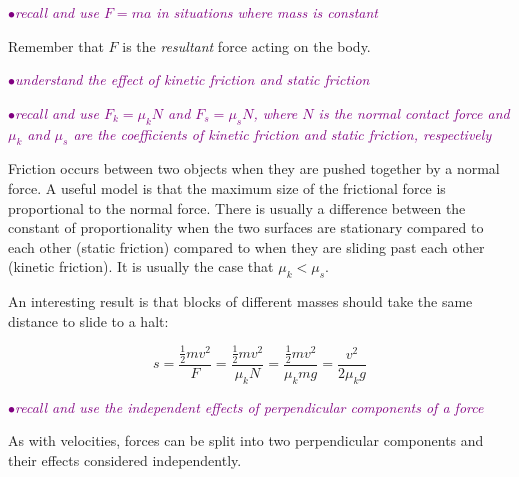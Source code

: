 \documentclass[a4paper,11pt,twoside]{memoir}
\newcounter{spec}[chapter]
\newcommand{\spec}[1]{\Needspace{5\baselineskip}\textcolor{purple}{$\bullet$\hspace{0.5cm}\textit{#1}}}
\begin{document}
\spec{recall and use $F = ma$ in situations where mass is constant}

Remember that $F$ is the \emph{resultant} force acting on the body.

\spec{understand the effect of kinetic friction and static friction}

\spec{recall and use $F_k = \mu_k N$ and $F_s = \mu_s N$, where $N$ is the normal contact force and $\mu_k$ and $\mu_s$ are the coefficients of kinetic friction and static friction, respectively}

Friction occurs between two objects when they are pushed together by a normal force. A useful model is that the maximum size of the frictional force is proportional to the normal force. There is usually a difference between the constant of proportionality when the two surfaces are stationary compared to each other (static friction) compared to when they are sliding past each other (kinetic friction). It is usually the case that $\mu_k < \mu_s$.

An interesting result is that blocks of different masses should take the same distance to slide to a halt:

\[ s = \frac{\frac{1}{2}mv^2}{F} = \frac{\frac{1}{2}mv^2}{\mu_k N} = \frac{\frac{1}{2}mv^2}{\mu_k mg} = \frac{v^2}{2\mu_k g} \]

\spec{recall and use the independent effects of perpendicular components of a force}

As with velocities, forces can be split into two perpendicular components and their effects considered independently.
\end{document}
